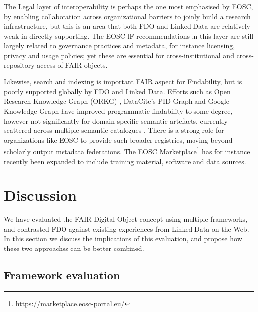 \documentclass[fleqn,10pt,NOlineno]{wlpeerjlua}
\begin{document}
The Legal layer of interoperability is perhaps the one most emphasised by EOSC, by enabling collaboration across organizational barriers to joinly build a research infrastructure, but this is an area that both FDO and Linked Data are relatively weak in directly supporting. The EOSC IF recommendations in this layer are still largely related to governance practices and metadata, for instance licensing, privacy and usage policies; yet these are essential for cross-institutional and cross-repository access of FAIR objects. 

Likewise, search and indexing is important FAIR aspect for Findability, but is poorly supported globally by FDO and Linked Data. Efforts such as Open Research Knowledge Graph (ORKG) \autocite{10.1007/978-3-030-30760-8_31}, DataCite's PID Graph \autocite{10.5438/jwvf-8a66} and Google Knowledge Graph \autocite{singhal2012} have improved programmatic findability to some degree, however not significantly for domain-specific semantic artefacts, currently scattered across multiple semantic catalogues \autocite{10.48550/arXiv.2305.06746}.  There is a strong role for organizations like EOSC to provide such broader registries, moving beyond scholarly output metadata federations. The EOSC Marketplace\footnote{\url{https://marketplace.eosc-portal.eu/}} has for instance recently been expanded to include training material, software and data sources.



\section*{Discussion}\label{sec:discussion}

We have evaluated the FAIR Digital Object concept using multiple frameworks, and contrasted FDO against existing experiences from Linked Data on the Web. In this section we discuss the implications of this evaluation, and propose how these two approaches can be better combined.

\subsection*{Framework evaluation}
\end{document}
